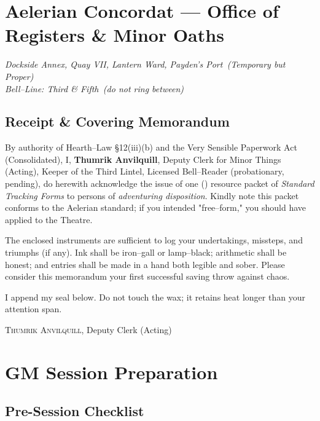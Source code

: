 \documentclass[11pt,letterpaper]{article}
\begin{document}
\maketitle
\thispagestyle{fancy}
\tableofcontents
\newpage

\section*{Aelerian Concordat — Office of Registers \& Minor Oaths}

\noindent\textit{Dockside Annex, Quay VII, Lantern Ward, Payden's Port \,(Temporary but Proper)}\\
\textit{Bell–Line: Third \& Fifth \,(do not ring between)}

\subsection*{Receipt \& Covering Memorandum}
\noindent By authority of Hearth–Law §12(iii)(b) and the Very Sensible Paperwork Act (Consolidated), I, \textbf{Thumrik Anvilquill}, Deputy Clerk for Minor Things (Acting), Keeper of the Third Lintel, Licensed Bell–Reader (probationary, pending), do herewith acknowledge the issue of one () resource packet of \emph{Standard Tracking Forms} to persons of \emph{adventuring disposition}. Kindly note this packet conforms to the Aelerian standard; if you intended "free–form," you should have applied to the Theatre.

\medskip
\noindent The enclosed instruments are sufficient to log your undertakings, missteps, and triumphs (if any). Ink shall be iron–gall or lamp–black; arithmetic shall be honest; and entries shall be made in a hand both legible and sober. Please consider this memorandum your first successful saving throw against chaos.

\medskip
\noindent I append my seal below. Do not touch the wax; it retains heat longer than your attention span.

\hfill\textsc{Thumrik Anvilquill}, Deputy Clerk (Acting)

\section{GM Session Preparation}

\subsection{Pre-Session Checklist}
\end{document}
